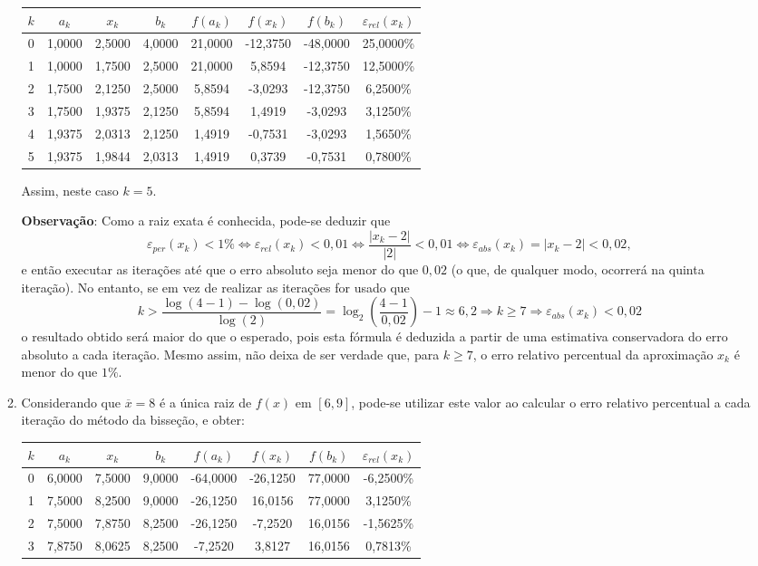 \documentclass[12pt,a4paper]{article}
\begin{document}
\begin{enumerate}
\begin{enumerate}
\begin{tabular}{cccccccc}
\hline
$k$ & $a_k$ & $x_k$ & $b_k$ & $f(a_k)$ & $f(x_k)$ & $f(b_k)$ & $\varepsilon_{rel}(x_k)$ \\
\hline
0 & 1,0000 & 2,5000 & 4,0000 & 21,0000 & -12,3750 & -48,0000 & 25,0000\% \\
1 & 1,0000 & 1,7500 & 2,5000 & 21,0000 &   5,8594 & -12,3750 & 12,5000\%\\
2 & 1,7500 & 2,1250 & 2,5000 &  5,8594 &  -3,0293 & -12,3750 &  6,2500\%\\
3 & 1,7500 & 1,9375 & 2,1250 &  5,8594 &   1,4919 &  -3,0293 &  3,1250\%\\
4 & 1,9375 & 2,0313 & 2,1250 &  1,4919 &  -0,7531 &  -3,0293 &  1,5650\%\\
5 & 1,9375 & 1,9844 & 2,0313 &  1,4919 &   0,3739 &  -0,7531 &  0,7800\%\\
\hline
\end{tabular}

Assim, neste caso $k = 5$.

\textbf{Observação}: Como a raiz exata é conhecida, pode-se deduzir que
\[
\varepsilon_{per}(x_k) < 1\%
\Leftrightarrow
\varepsilon_{rel}(x_k) < 0,01
\Leftrightarrow
\frac{|x_k - 2|}{|2|} < 0,01
\Leftrightarrow
\varepsilon_{abs}(x_k) = |x_k - 2| < 0,02,
\]
e então executar as iterações até que o erro absoluto seja menor do que $0,02$ (o que, de qualquer modo, ocorrerá na quinta iteração). No entanto, se em vez de realizar as iterações for usado que
\[
k > \frac{\log(4-1)-\log(0,02)}{\log(2)} = \log_2 \left(\frac{4-1}{0,02}\right)-1 \approx 6,2
\Rightarrow
k \geq 7
\Rightarrow
\varepsilon_{abs}(x_k) < 0,02
\]
o resultado obtido será maior do que o esperado, pois esta fórmula é deduzida a partir de uma estimativa conservadora do erro absoluto a cada iteração. Mesmo assim, não deixa de ser verdade que, para $k\geq 7$, o erro relativo percentual da aproximação $x_k$ é menor do que $1\%$.

\item Considerando que $\overline{x} = 8$ é a única raiz de $f(x)$ em $[6, 9]$, pode-se utilizar este valor ao calcular o erro relativo percentual a cada iteração do método da bisseção, e obter:

\begin{tabular}{cccccccc}
\hline
$k$ & $a_k$ & $x_k$ & $b_k$ & $f(a_k)$ & $f(x_k)$ & $f(b_k)$ & $\varepsilon_{rel}(x_k)$ \\
\hline
0 & 6,0000 & 7,5000 & 9,0000 & -64,0000 & -26,1250 & 77,0000 & -6,2500\%\\
1 & 7,5000 & 8,2500 & 9,0000 & -26,1250 &  16,0156 & 77,0000 &  3,1250\%\\
2 & 7,5000 & 7,8750 & 8,2500 & -26,1250 &  -7,2520 & 16,0156 & -1,5625\%\\
3 & 7,8750 & 8,0625 & 8,2500 &  -7,2520 &   3,8127 & 16,0156 &  0,7813\%\\
\hline
\end{tabular}


\end{enumerate}
\end{enumerate}
\end{document}
